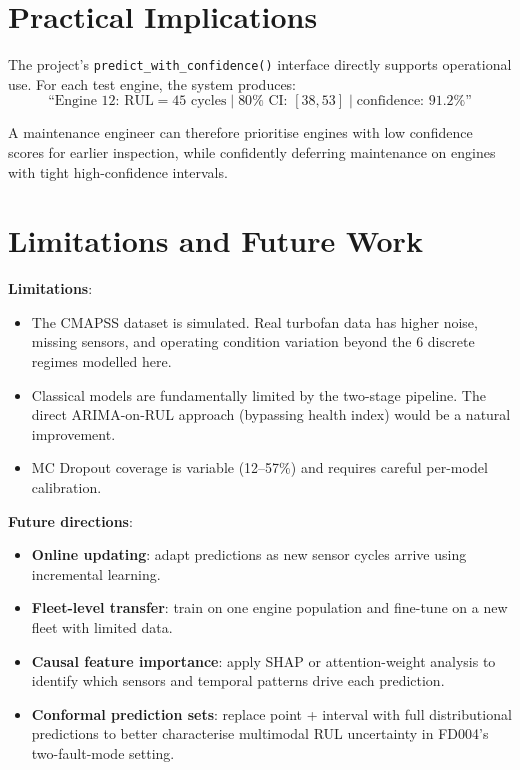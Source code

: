 \documentclass[12pt,a4paper]{report}
\begin{document}
\section{Practical Implications}

The project's \texttt{predict\_with\_confidence()} interface directly supports operational use. For each test engine, the system produces:
\[
\text{``Engine 12: RUL} = 45 \text{ cycles} \mid 80\%\text{ CI: }[38, 53] \mid \text{confidence: } 91.2\%\text{''}
\]

A maintenance engineer can therefore prioritise engines with low confidence scores for earlier inspection, while confidently deferring maintenance on engines with tight high-confidence intervals.

\section{Limitations and Future Work}

\textbf{Limitations}:
\begin{itemize}[leftmargin=1.5cm]
  \item The CMAPSS dataset is simulated. Real turbofan data has higher noise, missing sensors, and operating condition variation beyond the 6 discrete regimes modelled here.
  \item Classical models are fundamentally limited by the two-stage pipeline. The direct ARIMA-on-RUL approach (bypassing health index) would be a natural improvement.
  \item MC Dropout coverage is variable (12–57\%) and requires careful per-model calibration.
\end{itemize}

\textbf{Future directions}:
\begin{itemize}[leftmargin=1.5cm]
  \item \textbf{Online updating}: adapt predictions as new sensor cycles arrive using incremental learning.
  \item \textbf{Fleet-level transfer}: train on one engine population and fine-tune on a new fleet with limited data.
  \item \textbf{Causal feature importance}: apply SHAP or attention-weight analysis to identify which sensors and temporal patterns drive each prediction.
  \item \textbf{Conformal prediction sets}: replace point + interval with full distributional predictions to better characterise multimodal RUL uncertainty in FD004's two-fault-mode setting.
\end{itemize}
\end{document}

